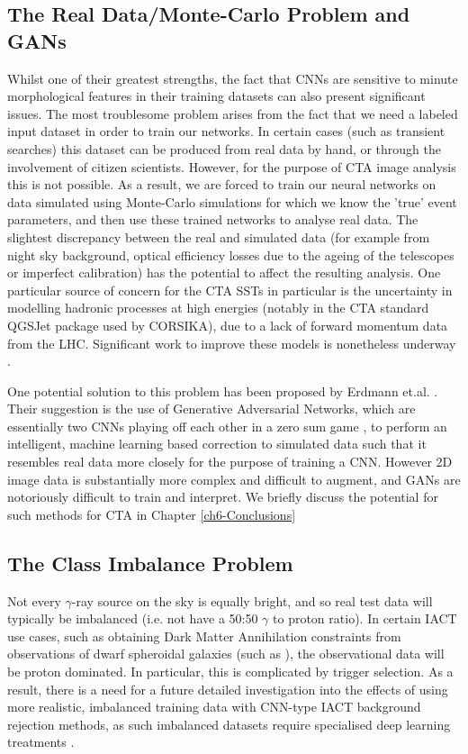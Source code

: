 \subsection{The Real Data/Monte-Carlo Problem and GANs}
Whilst one of their greatest strengths, the fact that CNNs are sensitive to minute morphological features in their training datasets can also present significant issues. The most troublesome problem arises from the fact that we need a labeled input dataset in order to train our networks. In certain cases (such as transient searches\cite{SNH}) this dataset can be produced from real data by hand, or through the involvement of citizen scientists. However, for the purpose of CTA image analysis this is not possible. As a result, we are forced to train our neural networks on data simulated using Monte-Carlo simulations for which we know the 'true' event parameters, and then use these trained networks to analyse real data. The slightest discrepancy between the real and simulated data (for example from night sky background, optical efficiency losses due to the ageing of the telescopes or imperfect calibration) has the potential to affect the resulting analysis. One particular source of concern for the CTA SSTs in particular is the uncertainty in modelling hadronic processes at high energies (notably in the CTA standard QGSJet package used by CORSIKA), due to a lack of forward momentum data from the LHC. Significant work to improve these models is nonetheless underway \cite{hadronmodel}.

One potential solution to this problem has been proposed by Erdmann et.al. \cite{ErdmannAuger}. Their suggestion is the use of Generative Adversarial Networks, which are essentially two CNNs playing off each other in a zero sum game \cite{goodfellow2016deep}, to perform an intelligent, machine learning based correction to simulated data such that it resembles real data more closely for the purpose of training a CNN. However 2D image data is substantially more complex and difficult to augment, and GANs are notoriously difficult to train and interpret. We briefly discuss the potential for such methods for CTA in Chapter \ref{ch6-Conclusions}

\subsection{The Class Imbalance Problem}

Not every $\gamma$-ray source on the sky is equally bright, and so real test data will typically be imbalanced (i.e. not have a 50:50 $\gamma$ to proton ratio). In certain IACT use cases, such as obtaining Dark Matter Annihilation constraints from observations of dwarf spheroidal galaxies (such as \cite{gloryduck}), the observational data will be proton dominated. In particular, this is complicated by trigger selection. As a result, there is a need for a future detailed investigation into the effects of using more realistic, imbalanced training data with CNN-type IACT background rejection methods, as such imbalanced datasets require specialised deep learning treatments \cite{imbalance}.

